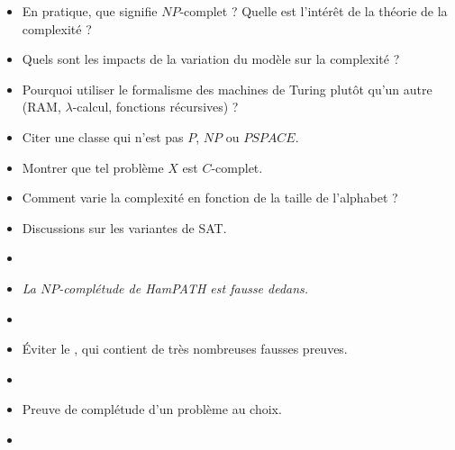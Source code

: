 \documentclass{agregfiche}
\begin{document}
\begin{itemize}
    \item En pratique, que signifie $NP$-complet ? Quelle est 
    l'intérêt de la théorie de la complexité ?
    \item Quels sont les impacts de la variation du modèle sur la 
    complexité ?
    \item Pourquoi utiliser le formalisme des machines de Turing 
        plutôt qu'un autre (RAM, $\lambda$-calcul, fonctions 
        récursives) ?
    \item Citer une classe qui n'est pas $P$, $NP$ ou $PSPACE$.
    \item Montrer que tel problème $X$ est $C$-complet.
    \item Comment varie la complexité en fonction de la taille de 
    l'alphabet ?
    \item Discussions sur les variantes de SAT.
\end{itemize}

\secreferences

\begin{itemize}
    \item 
\item 
\textit{La $NP$-complétude de HamPATH est fausse dedans.}
\item 
\item Éviter le , qui contient de très nombreuses 
fausses preuves.
\end{itemize}

\secdev

\begin{itemize}
    \item 
    \item Preuve de complétude d'un problème au choix.
    \item 
\end{itemize}
\end{document}
